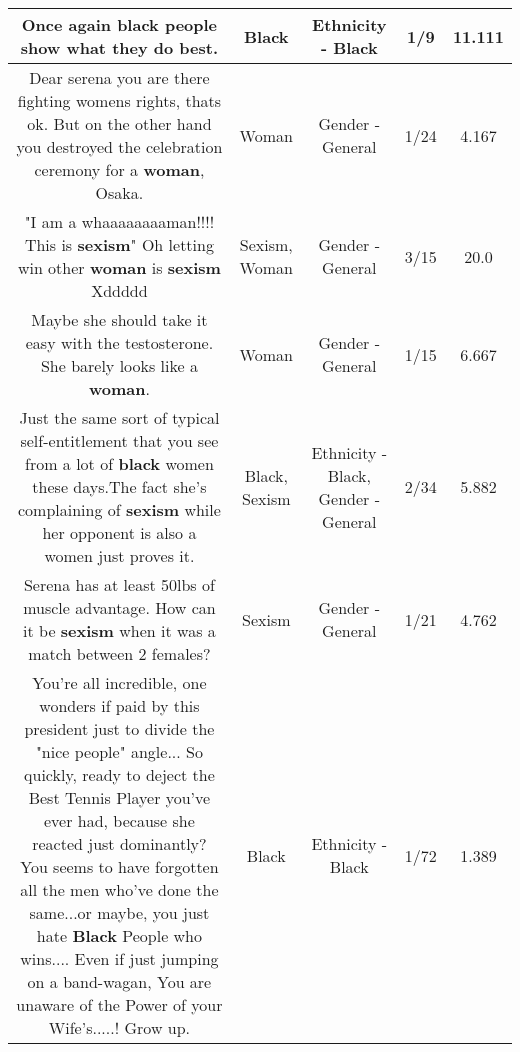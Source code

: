 \documentclass[11pt]{article}
\newlength\mylength
\begin{document}
\begin{center}
\begin{longtable}{|C{.65\mylength}|C{.30\mylength}|C{.12\mylength}|C{.12\mylength}|C{.12\mylength}|}
  \small Once again \textbf{black} people show what they do best.\normalsize   & Black & Ethnicity - Black & 1/9 & 11.111 \\  \hline
  \small Dear serena you are there fighting womens rights, thats ok. But  on the other hand you destroyed the celebration ceremony for a \textbf{woman}, Osaka.\normalsize   & Woman & Gender - General & 1/24 & 4.167 \\  \hline
  \small "I am a whaaaaaaaaman!!!! This is \textbf{sexism}" Oh letting win other \textbf{woman} is \textbf{sexism} Xddddd\normalsize   & Sexism, Woman & Gender - General & 3/15 & 20.0 \\  \hline
  \small Maybe she should take it easy with the testosterone. She barely looks like a \textbf{woman}.\normalsize   & Woman & Gender - General & 1/15 & 6.667 \\  \hline
  \small Just the same sort of typical self-entitlement that you see from a lot of \textbf{black} women these days.The fact she's complaining of \textbf{sexism} while her opponent is also a women just proves it.\normalsize   & Black, Sexism & Ethnicity - Black, Gender - General & 2/34 & 5.882 \\  \hline
  \small Serena has at least 50lbs of muscle advantage.  How can it be \textbf{sexism} when it was a match between 2 females?\normalsize   & Sexism & Gender - General & 1/21 & 4.762 \\  \hline
  \small You're all incredible, one wonders if paid by this president just to divide the "nice people" angle... So quickly, ready to deject the Best Tennis Player you've ever had, because she reacted just dominantly? You seems to have forgotten all the men who've done the same...or maybe, you just hate \textbf{Black} People who wins.... Even if just jumping on a band-wagan, You are unaware of the Power of your Wife's.....! Grow up.\normalsize   & Black & Ethnicity - Black & 1/72 & 1.389 \\  \hline

\end{longtable}
\end{center}
\end{document}
